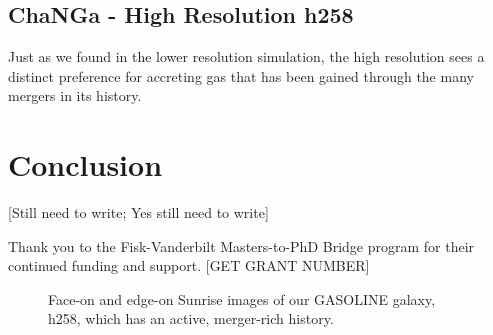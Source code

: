 \documentclass[manuscript]{aastex}
\begin{document}
\subsection{ChaNGa - High Resolution h258}

Just as we found in the lower resolution simulation, the high resolution sees a distinct preference for accreting gas that has been gained through the many mergers in its history. 


\section{Conclusion}

[Still need to write; Yes still need to write]


\acknowledgments
Thank you to the Fisk-Vanderbilt Masters-to-PhD Bridge program for their continued funding and support. [GET GRANT NUMBER]


\begin{figure}
\centerline{}
\caption[]{Face-on and edge-on Sunrise images of our GASOLINE galaxy, h258, which has an active, merger-rich history.}
\label{h258face} 
\end{figure}
\end{document}
